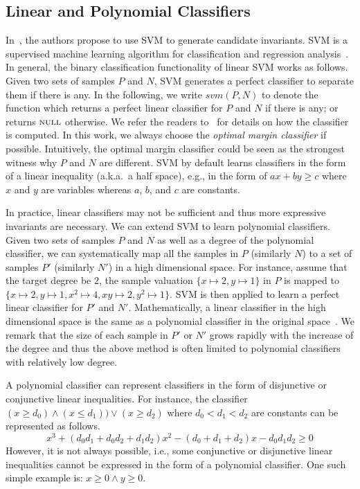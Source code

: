 \subsection{Linear and Polynomial Classifiers}
In~\cite{sharma2012interpolants}, the authors propose to use SVM to generate candidate invariants. SVM is a supervised machine learning algorithm for classification and regression analysis~\cite{svm:original}.
In general, the binary classification functionality of linear SVM works as follows. Given two sets of samples $P$ and $N$, SVM generates a perfect classifier to separate them if there is any.
In the following, we write $svm(P, N)$ to denote the function which returns a perfect linear classifier for $P$ and $N$ if there is any; or returns $\textsc{null}$ otherwise. We refer the readers to~\cite{svm:smo} for details on how the classifier is computed. In this work, we always choose the \textit{optimal margin classifier} if possible. Intuitively, the optimal margin classifier could be seen as the strongest witness why $P$ and $N$ are different.
SVM by default learns classifiers in the form of a linear inequality (a.k.a.~a half space), e.g., in the form of $a x + b y \geq c$ where $x$ and $y$ are variables whereas $a$, $b$, and $c$ are constants.

In practice, linear classifiers may not be sufficient and thus more expressive invariants are necessary. We can extend SVM to learn polynomial classifiers. Given two sets of samples $P$ and $N$ as well as a degree of the polynomial classifier, we can systematically map all the samples in $P$ (similarly $N$) to a set of samples $P'$ (similarly $N'$) in a high dimensional space. For instance, assume that the target degree be 2, the sample valuation $\{ x \mapsto 2, y \mapsto 1\}$ in $P$ is mapped to $\{x \mapsto 2, y \mapsto 1, x^2 \mapsto 4, xy \mapsto 2, y^2 \mapsto 1\}$.
SVM is then applied to learn a perfect linear classifier for $P'$ and $N'$. Mathematically, a linear classifier in the high dimensional space is the same as a polynomial classifier in the original space~\cite{svm:kernel}.
We remark that the size of each sample in $P'$ or $N'$ grows rapidly with the increase of the degree and thus the above method is often limited to polynomial classifiers with relatively low degree.

A polynomial classifier can represent classifiers in the form of disjunctive or conjunctive linear inequalities. For instance, the classifier $(x \ge d_0) \wedge (x \le d_1)\big) \vee (x \ge d_2)$
where $d_0 < d_1 < d_2$ are constants can be represented as follows.
\[
x^3 + (d_0d_1 + d_0d_2 + d_1d_2)x^2 - (d_0 + d_1 + d_2)x - d_0d_1d_2 \geq 0
\]
However, it is not always possible, i.e., some conjunctive or disjunctive linear inequalities cannot be expressed in the form of a polynomial classifier. One such simple example is: $x \ge 0 \land y \ge 0$.

